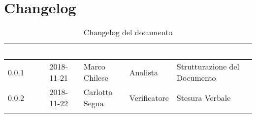 \newpage

\section{Changelog}

\begin{center}
\begin{longtable}[c]{|m{}|m{}|m{}|m{}|p{}|}
\hline
\rowcolor{bluelogo}\textbf{\textcolor{white}{Versione}} & \textbf{\textcolor{white}{Data}} & \textbf{\textcolor{white}{Autore}} & \textbf{\textcolor{white}{Ruolo}} & \textbf{\textcolor{white}{Descrizione}}\\
\hline \hline
\endfirsthead
0.0.1 & 2018-11-21 & Marco Chilese & Analista & Strutturazione del Documento \\
\rowcolor{grigio} 0.0.2 & 2018-11-22 & Carlotta Segna & Verificatore & Stesura Verbale \\
\hline
\caption{Changelog del documento}
\end{longtable}
\end{center}
